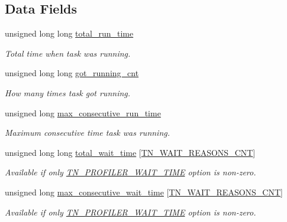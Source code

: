 \subsection*{Data Fields}
\begin{DoxyCompactItemize}
\item 
unsigned long long \hyperlink{structTN__TaskTiming_a97964cfe380308698fffd730964f4d5c}{total\+\_\+run\+\_\+time}
\begin{DoxyCompactList}\small\item\em Total time when task was running. \end{DoxyCompactList}\item 
unsigned long long \hyperlink{structTN__TaskTiming_ad158c48fe2c596d914cab40c9a7838ae}{got\+\_\+running\+\_\+cnt}
\begin{DoxyCompactList}\small\item\em How many times task got running. \end{DoxyCompactList}\item 
\mbox{\label{structTN__TaskTiming_af48cbd4118093e90b15b0b32134d949c}} 
unsigned long \hyperlink{structTN__TaskTiming_af48cbd4118093e90b15b0b32134d949c}{max\+\_\+consecutive\+\_\+run\+\_\+time}
\begin{DoxyCompactList}\small\item\em Maximum consecutive time task was running. \end{DoxyCompactList}\item 
unsigned long long \hyperlink{structTN__TaskTiming_a0832c998c39b3e8400ccbb386bfbc7d9}{total\+\_\+wait\+\_\+time} \mbox{[}\hyperlink{tn__tasks_8h_a343b0332013c15d6e878c2f60ed2c9b7a54de9b2b340a9d3f444aaeccda0764ea}{T\+N\+\_\+\+W\+A\+I\+T\+\_\+\+R\+E\+A\+S\+O\+N\+S\+\_\+\+C\+NT}\mbox{]}
\begin{DoxyCompactList}\small\item\em Available if only {\ttfamily \hyperlink{tn__cfg__default_8h_a1c04db5457adb54f7cc38d42b29a5ad7}{T\+N\+\_\+\+P\+R\+O\+F\+I\+L\+E\+R\+\_\+\+W\+A\+I\+T\+\_\+\+T\+I\+ME}} option is non-\/zero. \end{DoxyCompactList}\item 
unsigned long \hyperlink{structTN__TaskTiming_abb5335583d7c59aaca03753ee121c1bb}{max\+\_\+consecutive\+\_\+wait\+\_\+time} \mbox{[}\hyperlink{tn__tasks_8h_a343b0332013c15d6e878c2f60ed2c9b7a54de9b2b340a9d3f444aaeccda0764ea}{T\+N\+\_\+\+W\+A\+I\+T\+\_\+\+R\+E\+A\+S\+O\+N\+S\+\_\+\+C\+NT}\mbox{]}
\begin{DoxyCompactList}\small\item\em Available if only {\ttfamily \hyperlink{tn__cfg__default_8h_a1c04db5457adb54f7cc38d42b29a5ad7}{T\+N\+\_\+\+P\+R\+O\+F\+I\+L\+E\+R\+\_\+\+W\+A\+I\+T\+\_\+\+T\+I\+ME}} option is non-\/zero. \end{DoxyCompactList}\end{DoxyCompactItemize}


